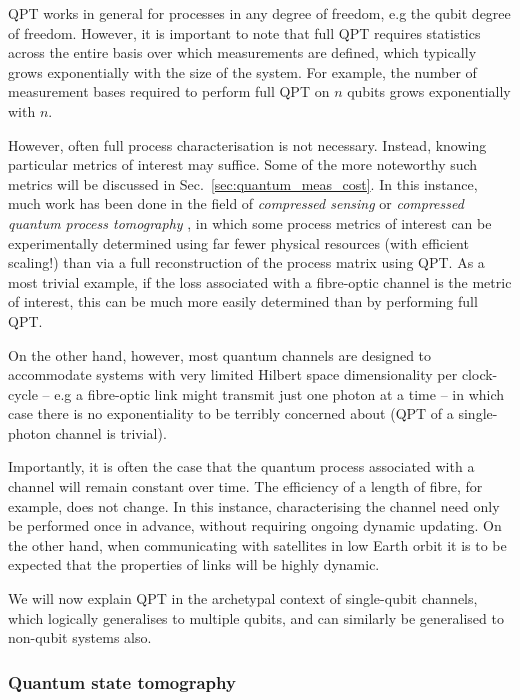 QPT works in general for processes in any degree of freedom, e.g the qubit degree of freedom. However, it is important to note that full QPT requires statistics across the entire basis over which measurements are defined, which typically grows exponentially with the size of the system. For example, the number of measurement bases required to perform full QPT on $n$ qubits grows exponentially with $n$.

However, often full process characterisation is not necessary. Instead, knowing particular metrics of interest may suffice. Some of the more noteworthy such metrics will be discussed in Sec.~\ref{sec:quantum_meas_cost}. In this instance, much work has been done in the field of \textit{compressed sensing} or \textit{compressed quantum process tomography} \cite{???,compressed_sensing}, in which some process metrics of interest can be experimentally determined using far fewer physical resources (with efficient scaling!) than via a full reconstruction of the process matrix using QPT. As a most trivial example, if the loss associated with a fibre-optic channel is the metric of interest, this can be much more easily determined than by performing full QPT.

On the other hand, however, most quantum channels are designed to accommodate systems with very limited Hilbert space dimensionality per clock-cycle -- e.g a fibre-optic link might transmit just one photon at a time -- in which case there is no exponentiality to be terribly concerned about (QPT of a single-photon channel is trivial).

Importantly, it is often the case that the quantum process associated with a channel will remain constant over time. The efficiency of a length of fibre, for example, does not change. In this instance, characterising the channel need only be performed once in advance, without requiring ongoing dynamic updating. On the other hand, when communicating with satellites in low Earth orbit it is to be expected that the properties of links will be highly dynamic.

We will now explain QPT in the archetypal context of single-qubit channels, which logically generalises to multiple qubits, and can similarly be generalised to non-qubit systems also.

%
%

\subsubsection{Quantum state tomography} 

